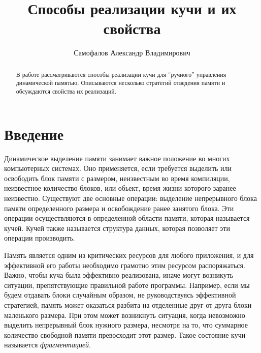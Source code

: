 \title{Способы реализации кучи и их свойства}
%
\author{Самофалов Александр Владимирович}
%
%
%

\maketitle              %

\begin{abstract}
В работе рассматриваются способы реализации кучи для ``ручного'' управления 
динамической памятью. Описываются несколько стратегий отведения памяти
и обсуждаются свойства их реализаций. 
\end{abstract}
%


\section*{Введение}

Динамическое выделение памяти занимает важное положение во многих компьютерных системах. Оно применяется,
если требуется выделить или освободить блок памяти с размером, неизвестным во время компиляции, 
неизвестное количество блоков, или обьект, время жизни которого заранее неизвестно. 
Существуют две основные операции: выделение непрерывного блока памяти определенного размера и 
освобождение ранее занятого блока. Эти операции осуществляются в определенной области памяти, которая называется кучей. 
Кучей также называется структура данных, которая позволяет эти операции производить.

Память является одним из критических ресурсов для любого приложения, и для эффективной его работы необходимо грамотно этим 
ресурсом распоряжаться. Важно, чтобы куча была эффективно реализована, иначе могут возникуть ситуации, препятствующие правильной 
работе программы. Например, если мы будем отдавать блоки случайным образом, не руководствуясь эффективной стратегией,
память может оказаться разбита на отделенные друг от друга блоки маленького размера. При этом может возникнуть ситуация,
когда невозможно выделить непрерывный блок нужного размера, несмотря на то, что суммарное количество свободной  памяти
превосходит этот размер. Такое состояние кучи называется \emph{фрагментацией}.

